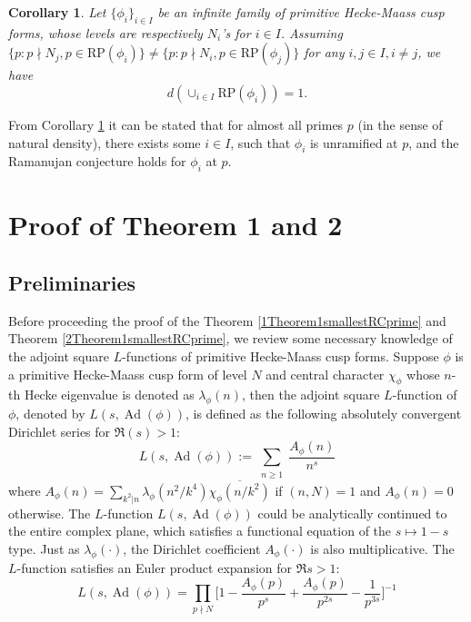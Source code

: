 \documentclass[10pt,leqno]{amsart}
\theoremstyle{plain}
\newtheorem{corollary}{Corollary}
\theoremstyle{definition}
\theoremstyle{remark}
\numberwithin{equation}{section}
\newcommand{\Ad}{\operatorname{Ad}}
\newcommand{\RP}{\text{RP}}
\begin{document}
\begin{corollary}\label{main result density infinitely many forms}
    Let $\{\phi_i\}_{i \in I}$ be an infinite family of primitive Hecke-Maass cusp forms, whose levels are respectively $N_i$'s for $i\in I$. Assuming $\{p:p \nmid N_j,p \in \RP(\phi_i)\} \neq \{p:p \nmid N_i, p \in \RP(\phi_j)\}$ for any $i,j \in I, i \neq j$, we have 
    \begin{equation}
        d(\cup_{i \in I} \RP(\phi_i))  = 1.
    \end{equation}
\end{corollary}

From Corollary \ref{main result density infinitely many forms} it can be stated that for almost all primes $p$ (in the sense of natural density), there exists some $i \in I$, such that $\phi_i$ is unramified at $p$, and the Ramanujan conjecture holds for $\phi_i$ at $p$.

 

\section{Proof of Theorem 1 and 2}
\subsection{Preliminaries}
Before proceeding the proof of the Theorem \ref{1Theorem1smallestRCprime} and Theorem \ref{2Theorem1smallestRCprime}, we review some necessary knowledge of the adjoint square $L$-functions of primitive Hecke-Maass cusp forms. 
Suppose $\phi$ is a primitive Hecke-Maass cusp form of level $N$ and central character $\chi_{\phi}$ whose $n$-th Hecke eigenvalue is denoted as $\lambda_{\phi}(n)$, then the adjoint square $L$-function of $\phi$, denoted by $L(s, \Ad(\phi))$, is defined as the following absolutely convergent Dirichlet series for $\Re(s) > 1$:
\[
    L(s, \Ad(\phi)) := \sum_{\substack{n \geq 1}}\frac{A_{\phi}(n)}{n^s}
\]
where $A_{\phi}(n) = \sum_{k^2|n}\lambda_{\phi}(n^2/k^4)\overline{\chi_{\phi}(n/k^2)}$ if $(n,N)=1$ and $A_{\phi}(n)= 0$ otherwise. The $L$-function $L(s, \Ad(\phi))$ could be analytically continued to the entire complex plane, which satisfies a functional equation of the $s \mapsto 1-s$ type.
Just as $\lambda_{\phi}(\cdot)$, the Dirichlet coefficient $A_{\phi}(\cdot)$ is also multiplicative.
The $L$-function satisfies an Euler product expansion for $\Re s > 1$:
\begin{equation}\label{EulerProductofAd}
    L(s,\Ad(\phi)) = \prod_{p\nmid N}\bigg[1 - \frac{A_{\phi}(p)}{p^s} + \frac{A_{\phi}(p)}{p^{2s}} - \frac{1}{p^{3s}}\bigg]^{-1}
\end{equation}
\end{document}
